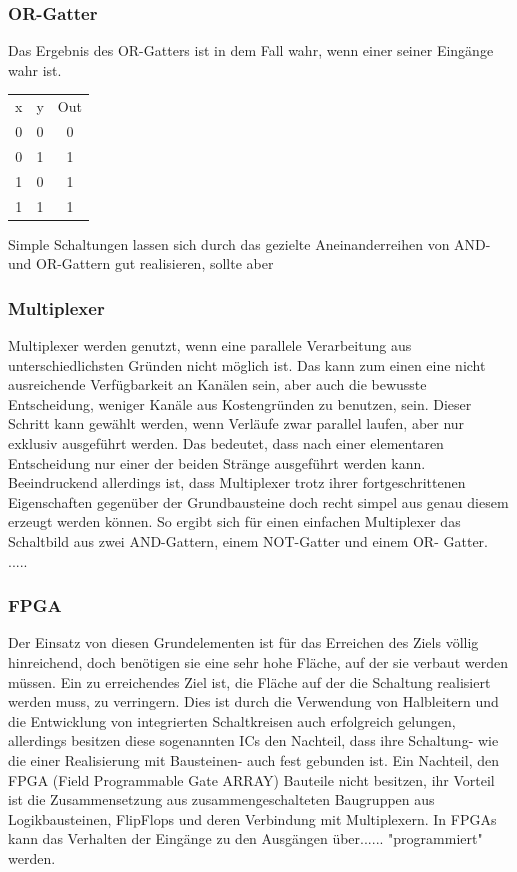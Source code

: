 \documentclass[conference]{IEEEtran}
\begin{document}
\subsubsection{OR-Gatter}
Das Ergebnis des OR-Gatters ist in dem Fall wahr, wenn einer seiner Eingänge wahr ist.\\
\begin{center}
\begin{tabular}[h]{ccc}
x&y&Out\\
0&0&0\\
0&1&1\\
1&0&1\\
1&1&1\\
\end{tabular}
\end{center}
Simple Schaltungen lassen sich durch das gezielte Aneinanderreihen von AND- und OR-Gattern gut realisieren, sollte aber 
\subsubsection{Multiplexer}
Multiplexer werden genutzt, wenn eine parallele Verarbeitung aus unterschiedlichsten Gründen nicht möglich ist. Das kann zum einen eine nicht ausreichende Verfügbarkeit an Kanälen sein, aber auch die bewusste Entscheidung, weniger Kanäle aus Kostengründen zu benutzen, sein. Dieser Schritt kann gewählt werden, wenn Verläufe zwar parallel laufen, aber nur exklusiv ausgeführt werden. Das bedeutet, dass nach einer elementaren Entscheidung nur einer der beiden Stränge ausgeführt werden kann. Beeindruckend allerdings ist, dass Multiplexer trotz ihrer fortgeschrittenen Eigenschaften gegenüber der Grundbausteine doch recht simpel aus genau diesem erzeugt werden können. So ergibt sich für einen einfachen Multiplexer das Schaltbild aus zwei AND-Gattern, einem NOT-Gatter und einem OR- Gatter. .....
\subsubsection{FPGA}
Der Einsatz von diesen Grundelementen ist für das Erreichen des Ziels völlig hinreichend, doch benötigen sie eine sehr hohe Fläche, auf der sie verbaut werden müssen. Ein zu erreichendes Ziel ist, die Fläche auf der die Schaltung realisiert werden muss, zu verringern. Dies ist durch die Verwendung von Halbleitern und die Entwicklung von integrierten Schaltkreisen auch erfolgreich gelungen, allerdings besitzen diese sogenannten ICs den Nachteil, dass ihre Schaltung- wie die einer Realisierung mit Bausteinen- auch fest gebunden ist. Ein Nachteil, den FPGA (Field Programmable Gate ARRAY) Bauteile nicht besitzen, ihr Vorteil ist die Zusammensetzung aus zusammengeschalteten Baugruppen aus Logikbausteinen, FlipFlops und deren Verbindung mit Multiplexern. In FPGAs kann das Verhalten der Eingänge zu den Ausgängen über{\color{red}...... }"programmiert" werden.
\end{document}
